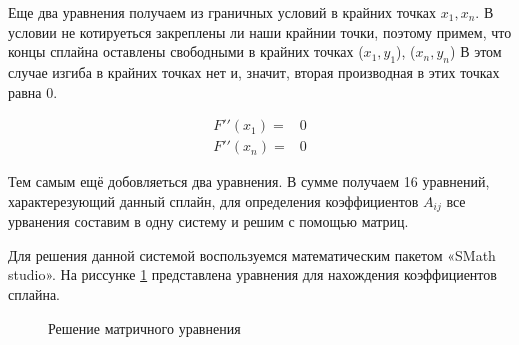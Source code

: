 \documentclass[russian,utf8,nocolumnxxxi,nocolumnxxxii]{eskdtext}
\begin{document}
Еще два уравнения получаем из граничных условий в крайних точках $x_1, x_n$. В условии не котируеться закреплены ли наши крайнии точки, поэтому примем, что концы сплайна оставлены свободными в крайних точках ($x_1, y_1$), ($x_n, y_n$) В этом случае изгиба в крайних точках нет и, значит, вторая производная в этих точках равна 0.

\[\begin{align*}
F′′(x_1)=&0\\
F′′(x_n)=&0
\end{align*}
\]

Тем самым ещё добовляеться два уравнения. В сумме получаем 16 уравнений, характерезующий данный сплайн, для определения коэффициентов $A_{ij}$ все урванения составим в одну систему и решим с помощью матриц. 

Для решения данной системой воспользуемся математическим пакетом  «SMath studio». На риссунке \ref{matcot}      представлена уравнения для нахождения коэффициентов сплайна.

\begin{figure}
\begin{center}
\caption{Решение матричного уравнения } \label{matcot}
\end{center}
\end{figure}
\end{document}
